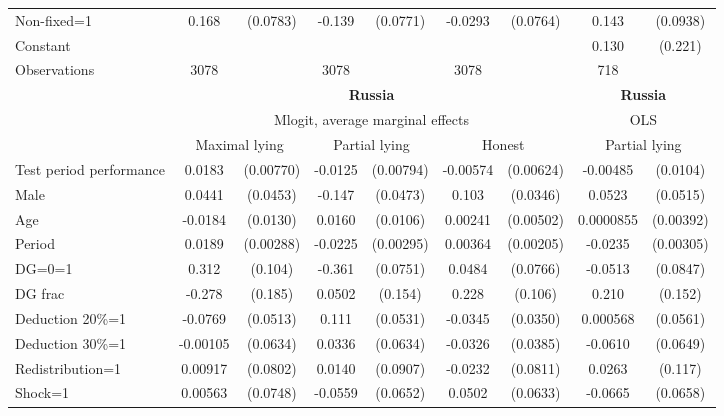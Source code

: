 \begin{tabular}{l|cccccc|cc}
Non-fixed=1     &    0.168\sym{**} & (0.0783)&   -0.139\sym{*}  & (0.0771)&  -0.0293         & (0.0764)&    0.143         & (0.0938)\\
Constant        &                  &         &                  &         &                  &         &    0.130         &  (0.221)\\
\hline
Observations    &     3078         &         &     3078         &         &     3078         &         &      718         &         \\
\hline\hline
&\multicolumn{6}{c|}{\bf Russia}&\multicolumn{2}{c}{\bf Russia}\\ &\multicolumn{6}{c|}{Mlogit, average marginal effects }&\multicolumn{2}{c}{OLS}\\
                &\multicolumn{2}{c}{Maximal lying}&\multicolumn{2}{c}{Partial lying}&\multicolumn{2}{c}{Honest}  &\multicolumn{2}{c}{Partial lying}\\
\hline
Test period performance&   0.0183\sym{**} &(0.00770)&  -0.0125         &(0.00794)& -0.00574         &(0.00624)& -0.00485         & (0.0104)\\
Male            &   0.0441         & (0.0453)&   -0.147\sym{***}& (0.0473)&    0.103\sym{***}& (0.0346)&   0.0523         & (0.0515)\\
Age             &  -0.0184         & (0.0130)&   0.0160         & (0.0106)&  0.00241         &(0.00502)&0.0000855         &(0.00392)\\
Period          &   0.0189\sym{***}&(0.00288)&  -0.0225\sym{***}&(0.00295)&  0.00364\sym{*}  &(0.00205)&  -0.0235\sym{***}&(0.00305)\\
DG=0=1          &    0.312\sym{***}&  (0.104)&   -0.361\sym{***}& (0.0751)&   0.0484         & (0.0766)&  -0.0513         & (0.0847)\\
DG frac         &   -0.278         &  (0.185)&   0.0502         &  (0.154)&    0.228\sym{**} &  (0.106)&    0.210         &  (0.152)\\
Deduction 20\%=1&  -0.0769         & (0.0513)&    0.111\sym{**} & (0.0531)&  -0.0345         & (0.0350)& 0.000568         & (0.0561)\\
Deduction 30\%=1& -0.00105         & (0.0634)&   0.0336         & (0.0634)&  -0.0326         & (0.0385)&  -0.0610         & (0.0649)\\
Redistribution=1&  0.00917         & (0.0802)&   0.0140         & (0.0907)&  -0.0232         & (0.0811)&   0.0263         &  (0.117)\\
Shock=1         &  0.00563         & (0.0748)&  -0.0559         & (0.0652)&   0.0502         & (0.0633)&  -0.0665         & (0.0658)\\

\end{tabular}
